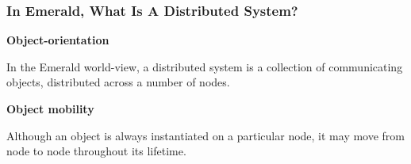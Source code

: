 \begin{frame}

\frametitle{In Emerald, What Is A Distributed System?}

\vspace{\fill}

\textbf{Object-orientation}

In the Emerald world-view, a distributed system is a collection of
communicating objects, distributed across a number of nodes.

\vspace{\fill}

\textbf{Object mobility}

Although an object is always instantiated on a particular node, it may
move from node to node throughout its lifetime.

\vspace{\fill}

\end{frame}

